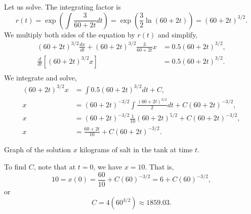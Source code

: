 \begin{example}
Let us solve.  The integrating factor is
\begin{equation*}
r(t) = \exp \left( \int \frac{3}{60+2t} dt  \right)
=
\exp \left( \frac{3}{2} \ln (60+2t) \right)
=
{(60+2t)}^{3/2} .
\end{equation*}
We multiply both sides of the equation by $r(t)$ and simplify,
\begin{align*}
{(60+2t)}^{3/2} \frac{dx}{dt} +
{(60+2t)}^{3/2} \frac{3}{60+2t} x
& =
0.5{(60+2t)}^{3/2} ,\\
\frac{d}{dt}\left[
{(60+2t)}^{3/2} x \right]
& =
0.5{(60+2t)}^{3/2} .\\
\end{align*}
We integrate and solve,
\begin{align*}
{(60+2t)}^{3/2} x
& =
\int
0.5{(60+2t)}^{3/2}
dt
+C ,\\
 x
& =
{(60+2t)}^{-3/2} \int
\frac{
{(60+2t)}^{3/2}
}{2}
dt
+C{(60+2t)}^{-3/2} ,\\
 x
& =
{(60+2t)}^{-3/2}
\frac{1}{10}{(60+2t)}^{5/2}
+C{(60+2t)}^{-3/2} ,\\
 x
& =
\frac{60+2t}{10}
+C{(60+2t)}^{-3/2} .
\end{align*}

\begin{mywrapfig}[17]{3.25in}
\capstart
{}
\caption{Graph of the solution $x$ kilograms of salt in the tank at time
$t$.\label{linear-salt-graph:fig}}
\end{mywrapfig}
%
%
To find $C$, note that at $t=0$, we have $x=10$.  That is,
\begin{equation*}
10 = x(0)
=
\frac{60}{10}
+C{(60)}^{-3/2}
=
6
+C{(60)}^{-3/2} ,
\end{equation*}
or
\begin{equation*}
C=4 ({60}^{3/2}) \approx 1859.03 .
\end{equation*}


\end{example}
